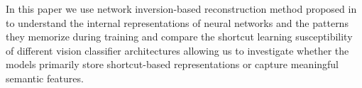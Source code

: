 In this paper we use network inversion-based reconstruction method proposed in \cite{suhail2024net} to understand the internal representations of neural networks and the patterns they memorize during training and compare the shortcut learning susceptibility of different vision classifier architectures allowing us to investigate whether the models primarily store shortcut-based representations or capture meaningful semantic features.